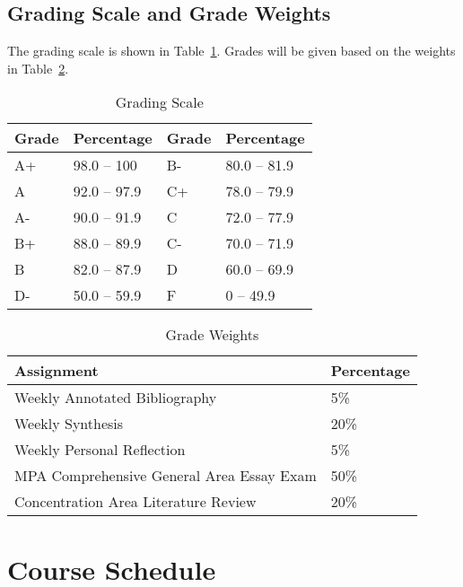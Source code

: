 \documentclass[12pt, letterpaper]{article}
\begin{document}
\subsection*{Grading Scale and Grade Weights}  

The grading scale is shown in Table~\ref{tab:grading-scale}. Grades will be given based on the weights in Table~\ref{tab:grade-weights}.

\begin{table}[h]
\centering
\caption{Grading Scale}
\begin{tabular}{llll}
\toprule
\textbf{Grade} & \textbf{Percentage} & \textbf{Grade} & \textbf{Percentage} \\
\midrule
A+ & 98.0 -- 100 & B- & 80.0 -- 81.9\\
A & 92.0 -- 97.9 & C+ & 78.0 -- 79.9\\
A- & 90.0 -- 91.9 & C & 72.0 -- 77.9\\
B+ & 88.0 -- 89.9 & C- & 70.0 -- 71.9\\
B & 82.0 -- 87.9 & D & 60.0 -- 69.9\\
D- & 50.0 -- 59.9 & F & 0 -- 49.9\\

\bottomrule
\end{tabular}
\label{tab:grading-scale}
\end{table}


\begin{table}[h!]
\centering
\caption{Grade Weights}
\begin{tabular}{ll}
    \toprule
\textbf{Assignment} & \textbf{Percentage} \\
\midrule
Weekly Annotated Bibliography & 5\% \\
Weekly Synthesis & 20\% \\
Weekly Personal Reflection & 5\% \\
MPA Comprehensive General Area Essay Exam & 50\% \\
Concentration Area Literature Review & 20\%\\
\bottomrule
\end{tabular}
\label{tab:grade-weights}
\end{table}

\section{Course Schedule}
\end{document}
